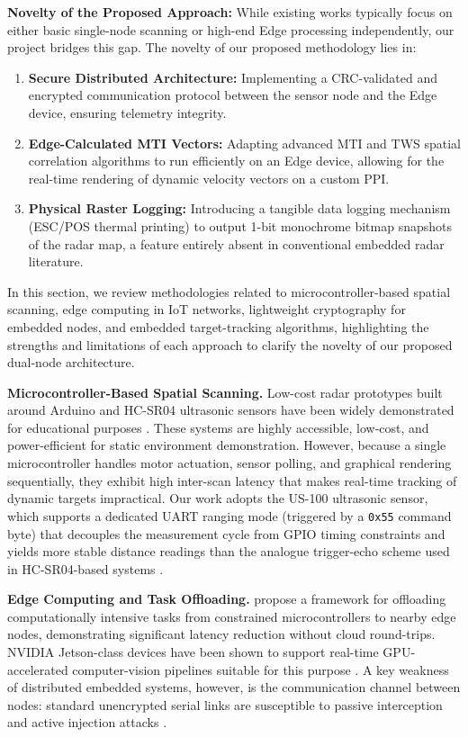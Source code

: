\documentclass[14pt]{article}
\begin{document}
\textbf{Novelty of the Proposed Approach:}
While existing works typically focus on either basic single-node scanning or high-end Edge processing independently, our project bridges this gap. The novelty of our proposed methodology lies in:
\begin{enumerate}
    \item \textbf{Secure Distributed Architecture:} Implementing a CRC-validated and encrypted communication protocol between the sensor node and the Edge device, ensuring telemetry integrity.
    \item \textbf{Edge-Calculated MTI Vectors:} Adapting advanced MTI and TWS spatial correlation algorithms to run efficiently on an Edge device, allowing for the real-time rendering of dynamic velocity vectors on a custom PPI.
    \item \textbf{Physical Raster Logging:} Introducing a tangible data logging mechanism (ESC/POS thermal printing) to output 1-bit monochrome bitmap snapshots of the radar map, a feature entirely absent in conventional embedded radar literature.
\end{enumerate}
\fi
In this section, we review methodologies related to microcontroller-based
spatial scanning, edge computing in IoT networks, lightweight cryptography
for embedded nodes, and embedded target-tracking algorithms, highlighting
the strengths and limitations of each approach to clarify the novelty of
our proposed dual-node architecture.

\textbf{Microcontroller-Based Spatial Scanning.}
Low-cost radar prototypes built around Arduino and HC-SR04 ultrasonic sensors
have been widely demonstrated for educational purposes
\citep{AlShammari2019, Banzi2011}. These systems are highly accessible,
low-cost, and power-efficient for static environment demonstration. However,
because a single microcontroller handles motor actuation, sensor polling, and
graphical rendering sequentially, they exhibit high inter-scan latency that
makes real-time tracking of dynamic targets impractical. Our work adopts the
US-100 ultrasonic sensor, which supports a dedicated UART ranging mode
(triggered by a \texttt{0x55} command byte) that decouples the measurement
cycle from GPIO timing constraints and yields more stable distance readings
than the analogue trigger-echo scheme used in HC-SR04-based
systems \citep{STMicro2018}.

\textbf{Edge Computing and Task Offloading.}
\citet{Shi2016} propose a framework for offloading computationally intensive
tasks from constrained microcontrollers to nearby edge nodes, demonstrating
significant latency reduction without cloud round-trips. NVIDIA Jetson-class
devices have been shown to support real-time GPU-accelerated computer-vision
pipelines suitable for this purpose \citep{Franklin2019}. A key weakness of
distributed embedded systems, however, is the communication channel between
nodes: standard unencrypted serial links are susceptible to passive
interception and active injection attacks \citep{Bettayeb2020}.
\end{document}
